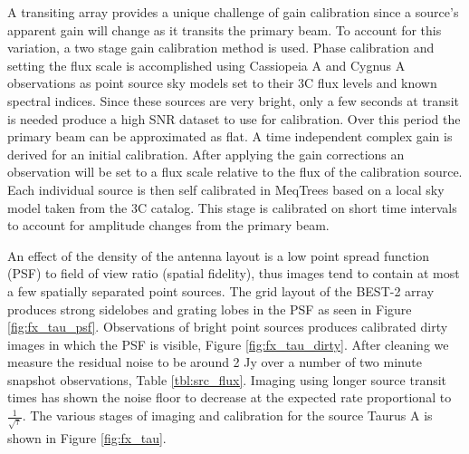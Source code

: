 \documentclass[useAMS,macros,usenatbib]{mn2e}
\begin{document}
A transiting array provides a unique challenge of gain calibration since a source's apparent gain will change as it transits the primary beam.
To account for this variation, a two stage gain calibration method is used.
Phase calibration and setting the flux scale is accomplished using Cassiopeia A and Cygnus A observations as point source sky models set to their 3C flux levels\citep{3cr} and known spectral indices.
Since these sources are very bright, only a few seconds at transit is needed produce a high SNR dataset to use for calibration.
Over this period the primary beam can be approximated as flat.
A time independent complex gain is derived for an initial calibration.
After applying the gain corrections an observation will be set to a flux scale relative to the flux of the calibration source.
Each individual source is then self calibrated in MeqTrees\citep{meqtrees} based on a local sky model taken from the 3C catalog.
This stage is calibrated on short time intervals to account for amplitude changes from the primary beam.

An effect of the density of the antenna layout is a low point spread function (PSF) to field of view ratio (spatial fidelity), thus images tend to contain at most a few spatially separated point sources.
The grid layout of the BEST-2 array produces strong sidelobes and grating lobes in the PSF as seen in Figure \ref{fig:fx_tau_psf}.
Observations of bright point sources produces calibrated dirty images in which the PSF is visible, Figure \ref{fig:fx_tau_dirty}.
After cleaning we measure the residual noise to be around 2 Jy over a number of two minute snapshot observations, Table \ref{tbl:src_flux}.
Imaging using longer source transit times has shown the noise floor to decrease at the expected rate proportional to $\frac{1}{\sqrt{\tau}}$.
The various stages of imaging and calibration for the source Taurus A is shown in Figure \ref{fig:fx_tau}.
\end{document}
